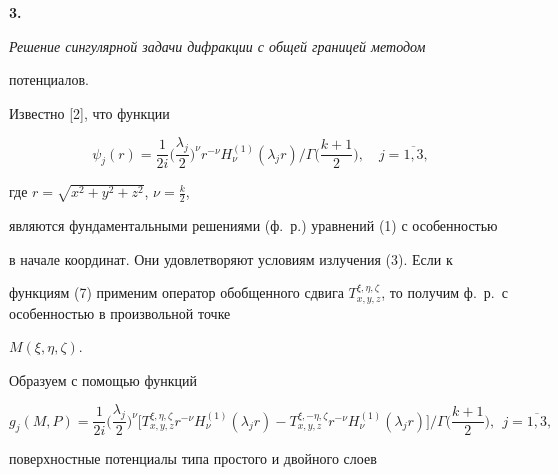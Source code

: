 {\bf 3.} {\it Решение сингулярной задачи дифракции с общей границей методом 


потенциалов.}





Известно [2], что функции


\begin{equation}


\psi_j(r)=\frac{1}{2i}\bigg(\frac{\lambda_j}{2}\bigg)^{\nu}r^{-\nu}


H_{\nu}^{(1)}(\lambda_j r)\bigg/\Gamma\bigg(\frac{k+1}{2}\bigg),\quad 


j=\overline{1,3},


\end{equation}


где $r=\sqrt{x^2+y^2+z^2}$, $\nu=\frac{k}{2}$, 


являются фундаментальными решениями (ф.~р.) уравнений (1) с особенностью 


в начале координат. Они удовлетворяют условиям излучения (3). Если к 


функциям (7) применим оператор обобщенного сдвига $T_{x,y,z}^{\xi,\eta,


\zeta}$, то получим ф.~р.\ с особенностью в произвольной точке 


$M(\xi, \eta, \zeta)$. 





Образуем с помощью функций


$$


g_j(M,P)=


\frac{1}{2i}\bigg(\frac{\lambda_j}{2}\bigg)^{\nu}


\bigg[T_{x,y,z}^{\xi,\eta,\zeta}r^{-\nu}H_{\nu}^{(1)}(\lambda_j r)-


T_{x,y,z}^{\xi,-\eta,\zeta}r^{-\nu}H_{\nu}^{(1)}(\lambda_j r)\bigg]


\bigg/\Gamma\bigg(\frac{k+1}{2}\bigg), \ \ j=\overline{1,3},


$$


поверхностные потенциалы типа простого и двойного слоев


